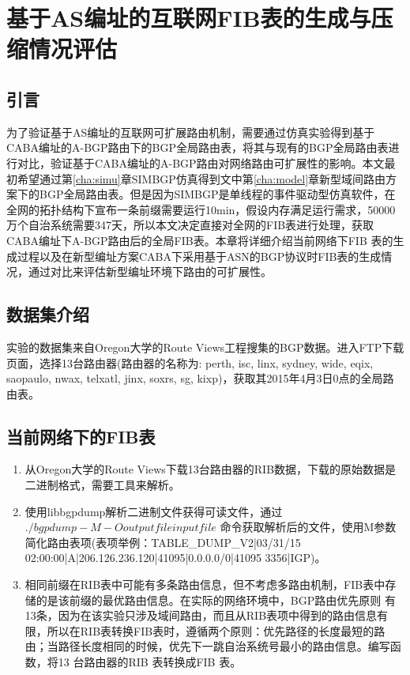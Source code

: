 

\chapter{基于AS编址的互联网FIB表的生成与压缩情况评估}

\section{引言}
为了验证基于AS编址的互联网可扩展路由机制，需要通过仿真实验得到基于CABA编址的A-BGP路由下的BGP全局路由表，将其与现有的BGP全局路由表进行对比，验证基于CABA编址的A-BGP路由对网络路由可扩展性的影响。本文最初希望通过第\ref{cha:simu}章SIMBGP仿真得到文中第\ref{cha:model}章新型域间路由方案下的BGP全局路由表。但是因为SIMBGP是单线程的事件驱动型仿真软件，在全网的拓扑结构下宣布一条前缀需要运行10min，假设内存满足运行需求，50000万个自治系统需要347天，所以本文决定直接对全网的FIB表进行处理，获取CABA编址下A-BGP路由后的全局FIB表。本章将详细介绍当前网络下FIB 表的生成过程以及在新型编址方案CABA下采用基于ASN的BGP协议时FIB表的生成情况，通过对比来评估新型编址环境下路由的可扩展性。
\section{数据集介绍}
实验的数据集来自Oregon大学的Route Views工程搜集的BGP数据。进入FTP下载页面，选择13台路由器(路由器的名称为: perth, isc, linx, sydney, wide, eqix, saopaulo, nwax, telxatl, jinx, soxrs, sg, kixp)，获取其2015年4月3日0点的全局路由表。

\section{当前网络下的FIB表}
\label{sect:fibtab}
\begin{enumerate}
\item 从Oregon大学的Route Views下载13台路由器的RIB数据，下载的原始数据是二进制格式，需要工具来解析。
\item 使用libbgpdump解析二进制文件获得可读文件，通过$./bgpdump -M -O outputfile inputfile$ 命令获取解析后的文件，使用M参数简化路由表项(表项举例：TABLE\_DUMP\_V2|03/31/15 02:00:00|A|206.126.236.120|41095|0.0.0.0/0|41095 3356|IGP)。
\item 相同前缀在RIB表中可能有多条路由信息，但不考虑多路由机制，FIB表中存储的是该前缀的最优路由信息。在实际的网络环境中，BGP路由优先原则
    \cite{preferRoutingPrinciple}有13条，因为在该实验只涉及域间路由，而且从RIB表项中得到的路由信息有限，所以在RIB表转换FIB表时，遵循两个原则：优先路径的长度最短的路由；当路径长度相同的时候，优先下一跳自治系统号最小的路由信息。编写函数，将13 台路由器的RIB 表转换成FIB 表。
\end{enumerate}

